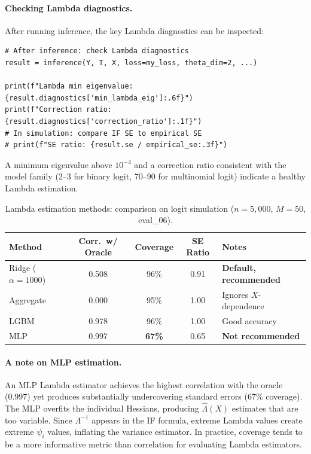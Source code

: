 \paragraph{Checking Lambda diagnostics.} After running inference, the key Lambda diagnostics can be inspected:

\begin{lstlisting}
# After inference: check Lambda diagnostics
result = inference(Y, T, X, loss=my_loss, theta_dim=2, ...)

print(f"Lambda min eigenvalue: {result.diagnostics['min_lambda_eig']:.6f}")
print(f"Correction ratio:      {result.diagnostics['correction_ratio']:.1f}")
# In simulation: compare IF SE to empirical SE
# print(f"SE ratio: {result.se / empirical_se:.3f}")
\end{lstlisting}

\noindent A minimum eigenvalue above $10^{-4}$ and a correction ratio consistent with the model family (2--3 for binary logit, 70--90 for multinomial logit) indicate a healthy Lambda estimation.

\begin{table}[ht]
\centering
\caption{Lambda estimation methods: comparison on logit simulation ($n=5{,}000$, $M=50$, eval\_06).}\label{tab:lambda_methods}
\begin{tabular}{lcccl}
\toprule
\textbf{Method} & \textbf{Corr.\ w/ Oracle} & \textbf{Coverage} & \textbf{SE Ratio} & \textbf{Notes} \\
\midrule
Ridge ($\alpha=1000$) & 0.508 & 96\% & 0.91 & \textbf{Default, recommended} \\
Aggregate             & 0.000 & 95\% & 1.00 & Ignores $X$-dependence \\
LGBM                  & 0.978 & 96\% & 1.00 & Good accuracy \\
MLP                   & 0.997 & \textbf{67\%} & 0.65 & \textbf{Not recommended} \\
\bottomrule
\end{tabular}
\end{table}

\paragraph{A note on MLP estimation.} An MLP Lambda estimator achieves the highest correlation with the oracle (0.997) yet produces substantially undercovering standard errors (67\% coverage). The MLP overfits the individual Hessians, producing $\hat{\Lambda}(X)$ estimates that are too variable. Since $\Lambda^{-1}$ appears in the IF formula, extreme Lambda values create extreme $\psi_i$ values, inflating the variance estimator. In practice, coverage tends to be a more informative metric than correlation for evaluating Lambda estimators.

